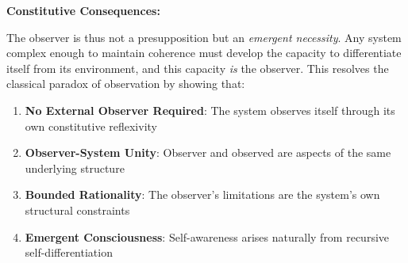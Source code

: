 \begin{scholium}
\textbf{Constitutive Consequences:}

The observer is thus not a presupposition but an \textit{emergent necessity}. Any system complex enough to maintain coherence must develop the capacity to differentiate itself from its environment, and this capacity \textit{is} the observer. This resolves the classical paradox of observation by showing that:

\begin{enumerate}
\item \textbf{No External Observer Required}: The system observes itself through its own constitutive reflexivity
\item \textbf{Observer-System Unity}: Observer and observed are aspects of the same underlying structure
\item \textbf{Bounded Rationality}: The observer's limitations are the system's own structural constraints
\item \textbf{Emergent Consciousness}: Self-awareness arises naturally from recursive self-differentiation
\end{enumerate}

\end{scholium}

